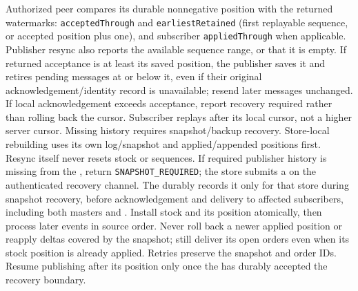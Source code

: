 \begin{description}[nosep,leftmargin=1em,style=nextline]
\item[\opResync\texttt{(role, source, lastKnownSequence, subscriptionId?)}]
Authorized peer compares its durable nonnegative position with the returned
watermarks: \texttt{acceptedThrough} and \texttt{earliestRetained} (first replayable sequence,
or accepted position plus one), and subscriber \texttt{appliedThrough} when applicable.
Publisher resync also reports the available \Outbox sequence range, or that it is empty.
If returned acceptance is at least its saved position, the publisher saves it and retires pending
messages at or below it, even if their original acknowledgement/identity record
is unavailable; resend later messages unchanged. If local acknowledgement exceeds
\CFE acceptance, report recovery required rather than rolling back the cursor.
Subscriber replays after its local cursor,
not a higher server cursor. Missing history requires snapshot/backup recovery.
Store-local rebuilding uses its own log/snapshot and applied/appended positions first.
Resync itself never resets stock or sequences. If required publisher history is
missing from the \Outbox, return \texttt{SNAPSHOT\_REQUIRED}; the store submits a
\StoreSnapshot on the authenticated recovery channel. The \CFE durably records it
only for that store during snapshot recovery, before acknowledgement and delivery
to affected subscribers, including both masters
and \ShippingOrderFulfillment. Install stock and its position atomically, then process
later events in source order.
Never roll back a newer applied position or reapply deltas covered by the snapshot;
still deliver its open orders even when its stock position is already applied.
Retries preserve the snapshot and order IDs. Resume publishing after its position
only once the \CFE has durably accepted the recovery boundary.
\end{description}

